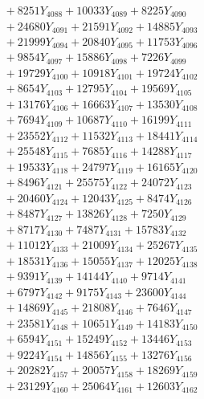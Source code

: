 \documentclass[a4paper,10pt]{article}
\begin{document}
{\begin{align}
&\;  + 8251 Y_{4088} + 10033 Y_{4089} + 8225 Y_{4090} \\[0.3ex]
&\;  + 24680 Y_{4091} + 21591 Y_{4092} + 14885 Y_{4093} \\[0.3ex]
&\;  + 21999 Y_{4094} + 20840 Y_{4095} + 11753 Y_{4096} \\[0.3ex]
&\;  + 9854 Y_{4097} + 15886 Y_{4098} + 7226 Y_{4099} \\[0.3ex]
&\;  + 19729 Y_{4100} + 10918 Y_{4101} + 19724 Y_{4102} \\[0.3ex]
&\;  + 8654 Y_{4103} + 12795 Y_{4104} + 19569 Y_{4105} \\[0.3ex]
&\;  + 13176 Y_{4106} + 16663 Y_{4107} + 13530 Y_{4108} \\[0.5ex]\allowbreak
&\;  + 7694 Y_{4109} + 10687 Y_{4110} + 16199 Y_{4111} \\[0.3ex]
&\;  + 23552 Y_{4112} + 11532 Y_{4113} + 18441 Y_{4114} \\[0.3ex]
&\;  + 25548 Y_{4115} + 7685 Y_{4116} + 14288 Y_{4117} \\[0.3ex]
&\;  + 19533 Y_{4118} + 24797 Y_{4119} + 16165 Y_{4120} \\[0.3ex]
&\;  + 8496 Y_{4121} + 25575 Y_{4122} + 24072 Y_{4123} \\[0.3ex]
&\;  + 20460 Y_{4124} + 12043 Y_{4125} + 8474 Y_{4126} \\[0.3ex]
&\;  + 8487 Y_{4127} + 13826 Y_{4128} + 7250 Y_{4129} \\[0.3ex]
&\;  + 8717 Y_{4130} + 7487 Y_{4131} + 15783 Y_{4132} \\[0.3ex]
&\;  + 11012 Y_{4133} + 21009 Y_{4134} + 25267 Y_{4135} \\[0.3ex]
&\;  + 18531 Y_{4136} + 15055 Y_{4137} + 12025 Y_{4138} \\[0.5ex]\allowbreak
&\;  + 9391 Y_{4139} + 14144 Y_{4140} + 9714 Y_{4141} \\[0.3ex]
&\;  + 6797 Y_{4142} + 9175 Y_{4143} + 23600 Y_{4144} \\[0.3ex]
&\;  + 14869 Y_{4145} + 21808 Y_{4146} + 7646 Y_{4147} \\[0.3ex]
&\;  + 23581 Y_{4148} + 10651 Y_{4149} + 14183 Y_{4150} \\[0.3ex]
&\;  + 6594 Y_{4151} + 15249 Y_{4152} + 13446 Y_{4153} \\[0.3ex]
&\;  + 9224 Y_{4154} + 14856 Y_{4155} + 13276 Y_{4156} \\[0.3ex]
&\;  + 20282 Y_{4157} + 20057 Y_{4158} + 18269 Y_{4159} \\[0.3ex]
&\;  + 23129 Y_{4160} + 25064 Y_{4161} + 12603 Y_{4162} \\[0.3ex]

\end{align}}
\end{document}
